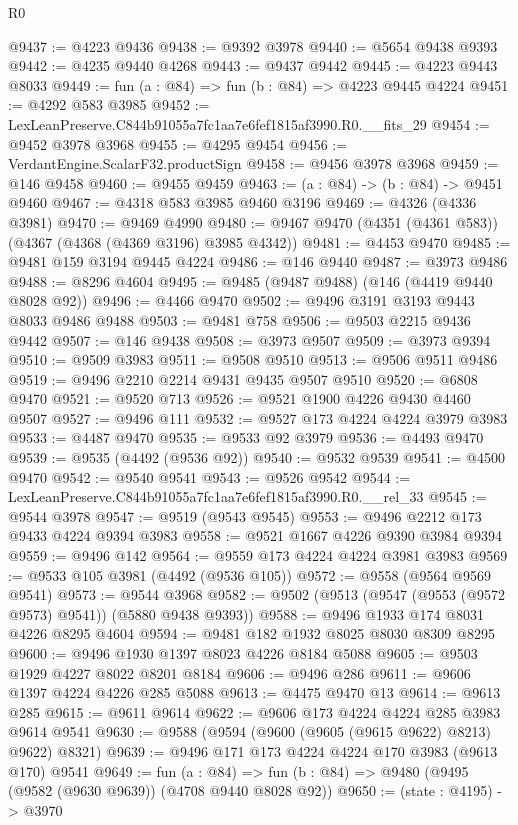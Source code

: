 \begin{lexlean}{R0}
\begin{coremodule}
@9437 := @4223 @9436
@9438 := @9392 @3978
@9440 := @5654 @9438 @9393
@9442 := @4235 @9440 @4268
@9443 := @9437 @9442
@9445 := @4223 @9443 @8033
@9449 := fun (a : @84) => fun (b : @84) => @4223 @9445 @4224
@9451 := @4292 @583 @3985
@9452 := LexLeanPreserve.C844b91055a7fc1aa7e6fef1815af3990.R0.__fits_29
@9454 := @9452 @3978 @3968
@9455 := @4295 @9454
@9456 := VerdantEngine.ScalarF32.productSign
@9458 := @9456 @3978 @3968
@9459 := @146 @9458
@9460 := @9455 @9459
@9463 := (a : @84) -> (b : @84) -> @9451 @9460
@9467 := @4318 @583 @3985 @9460 @3196
@9469 := @4326 (@4336 @3981)
@9470 := @9469 @4990
@9480 := @9467 @9470 (@4351 (@4361 @583)) (@4367 (@4368 (@4369 @3196) @3985 @4342))
@9481 := @4453 @9470
@9485 := @9481 @159 @3194 @9445 @4224
@9486 := @146 @9440
@9487 := @3973 @9486
@9488 := @8296 @4604
@9495 := @9485 (@9487 @9488) (@146 (@4419 @9440 @8028 @92))
@9496 := @4466 @9470
@9502 := @9496 @3191 @3193 @9443 @8033 @9486 @9488
@9503 := @9481 @758
@9506 := @9503 @2215 @9436 @9442
@9507 := @146 @9438
@9508 := @3973 @9507
@9509 := @3973 @9394
@9510 := @9509 @3983
@9511 := @9508 @9510
@9513 := @9506 @9511 @9486
@9519 := @9496 @2210 @2214 @9431 @9435 @9507 @9510
@9520 := @6808 @9470
@9521 := @9520 @713
@9526 := @9521 @1900 @4226 @9430 @4460 @9507
@9527 := @9496 @111
@9532 := @9527 @173 @4224 @4224 @3979 @3983
@9533 := @4487 @9470
@9535 := @9533 @92 @3979
@9536 := @4493 @9470
@9539 := @9535 (@4492 (@9536 @92))
@9540 := @9532 @9539
@9541 := @4500 @9470
@9542 := @9540 @9541
@9543 := @9526 @9542
@9544 := LexLeanPreserve.C844b91055a7fc1aa7e6fef1815af3990.R0.__rel_33
@9545 := @9544 @3978
@9547 := @9519 (@9543 @9545)
@9553 := @9496 @2212 @173 @9433 @4224 @9394 @3983
@9558 := @9521 @1667 @4226 @9390 @3984 @9394
@9559 := @9496 @142
@9564 := @9559 @173 @4224 @4224 @3981 @3983
@9569 := @9533 @105 @3981 (@4492 (@9536 @105))
@9572 := @9558 (@9564 @9569 @9541)
@9573 := @9544 @3968
@9582 := @9502 (@9513 (@9547 (@9553 (@9572 @9573) @9541)) (@5880 @9438 @9393))
@9588 := @9496 @1933 @174 @8031 @4226 @8295 @4604
@9594 := @9481 @182 @1932 @8025 @8030 @8309 @8295
@9600 := @9496 @1930 @1397 @8023 @4226 @8184 @5088
@9605 := @9503 @1929 @4227 @8022 @8201 @8184
@9606 := @9496 @286
@9611 := @9606 @1397 @4224 @4226 @285 @5088
@9613 := @4475 @9470 @13
@9614 := @9613 @285
@9615 := @9611 @9614
@9622 := @9606 @173 @4224 @4224 @285 @3983 @9614 @9541
@9630 := @9588 (@9594 (@9600 (@9605 (@9615 @9622) @8213) @9622) @8321)
@9639 := @9496 @171 @173 @4224 @4224 @170 @3983 (@9613 @170) @9541
@9649 := fun (a : @84) =>
  fun (b : @84) => @9480 (@9495 (@9582 (@9630 @9639)) (@4708 @9440 @8028 @92))
@9650 := (state : @4195) -> @3970

\end{coremodule}
\end{lexlean}
